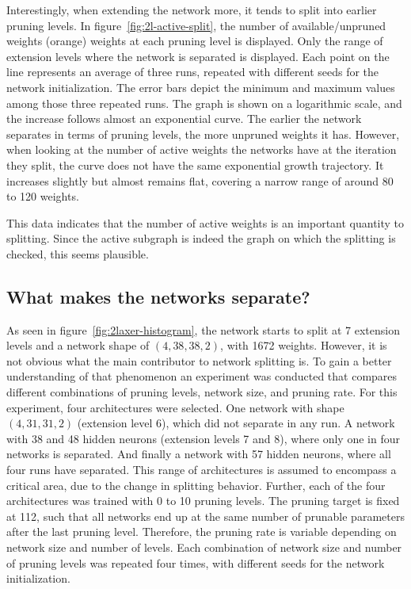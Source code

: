 Interestingly, when extending the network more, it tends to split into earlier pruning levels.
In figure~\ref{fig:2l-active-split}, the number of available/unpruned weights (orange) weights at each pruning level is displayed.
Only the range of extension levels where the network is separated is displayed.
Each point on the line represents an average of three runs, repeated with different seeds for the network initialization.
The error bars depict the minimum and maximum values among those three repeated runs.
The graph is shown on a logarithmic scale, and the increase follows almost an exponential curve.
The earlier the network separates in terms of pruning levels, the more unpruned weights it has.
However, when looking at the number of active weights the networks have at the iteration they split, the curve does not have the same exponential growth trajectory.
It increases slightly but almost remains flat, covering a narrow range of around 80 to 120 weights.

This data indicates that the number of active weights is an important quantity to splitting.
Since the active subgraph is indeed the graph on which the splitting is checked, this seems plausible.
 
\subsection{What makes the networks separate?}
As seen in figure~\ref{fig:2laxer-histogram}, the network starts to split at 7 extension levels and a network shape of $(4,38,38,2)$, with 1672 weights.
However, it is not obvious what the main contributor to network splitting is.
To gain a better understanding of that phenomenon an experiment was conducted that compares different combinations of pruning levels, network size, and pruning rate.
For this experiment, four architectures were selected.
One network with shape $(4,31,31,2)$ (extension level 6), which did not separate in any run.
A network with 38 and 48 hidden neurons (extension levels 7 and 8), where only one in four networks is separated.
And finally a network with 57 hidden neurons, where all four runs have separated.
This range of architectures is assumed to encompass a critical area, due to the change in splitting behavior.
Further, each of the four architectures was trained with 0 to 10 pruning levels.
The pruning target is fixed at 112, such that all networks end up at the same number of prunable parameters after the last pruning level.
Therefore, the pruning rate is variable depending on network size and number of levels.
Each combination of network size and number of pruning levels was repeated four times, with different seeds for the network initialization.

